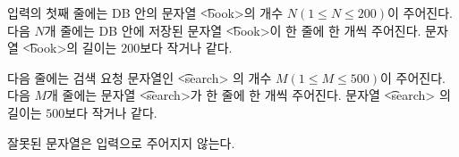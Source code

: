 입력의 첫째 줄에는 DB 안의 문자열 \t{<book>}의 개수 $N(1≤N≤200)$이 주어진다. 다음 $N$개 줄에는 DB 안에 저장된 문자열 \t{<book>}이 한 줄에 한 개씩 주어진다. 문자열 \t{<book>}의 길이는 $200$보다 작거나 같다.

다음 줄에는 검색 요청 문자열인 \t{<search>} 의 개수 $M(1≤M≤500)$이 주어진다. 다음 $M$개 줄에는 문자열 \t{<search>}가 한 줄에 한 개씩 주어진다.  문자열 \t{<search>} 의 길이는 $500$보다 작거나 같다.

잘못된 문자열은 입력으로 주어지지 않는다.
